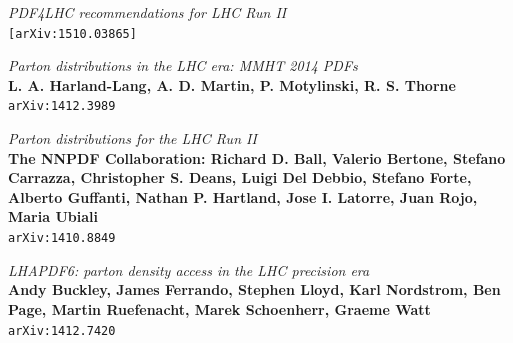 \documentclass[11pt,a4paper,final]{report}
\begin{document}
\begin{thebibliography}{9}
	\textit{PDF4LHC recommendations for LHC Run II}\\
	\texttt{[arXiv:1510.03865]}	
	
	\textit{Parton distributions in the LHC era: MMHT 2014 PDFs}\\
	\textbf{L. A. Harland-Lang, A. D. Martin, P. Motylinski, R. S. Thorne}\\
	\texttt{arXiv:1412.3989}
	
	\textit{Parton distributions for the LHC Run II}\\
	\textbf{The NNPDF Collaboration: Richard D. Ball, Valerio Bertone, Stefano Carrazza, Christopher S. Deans, Luigi Del Debbio, Stefano Forte, Alberto Guffanti, Nathan P. Hartland, Jose I. Latorre, Juan Rojo, Maria Ubiali}\\
	\texttt{arXiv:1410.8849}
	
	\textit{LHAPDF6: parton density access in the LHC precision era}\\
	\textbf{Andy Buckley, James Ferrando, Stephen Lloyd, Karl Nordstrom, Ben Page, Martin Ruefenacht, Marek Schoenherr, Graeme Watt}\\
	\texttt{arXiv:1412.7420}


\end{thebibliography}
\end{document}
